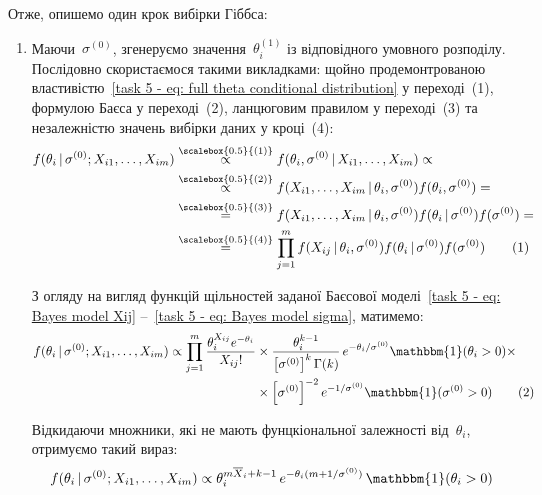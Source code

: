 Отже, опишемо один крок вибірки Гіббса:
\begin{enumerate}
    \item Маючи~$\sigma^{(0)}$, згенеруємо значення~$\theta_i^{(1)}$ із відповідного умовного розподілу. Послідовно скористаємося такими викладками: щойно продемонтрованою властивістю~\eqref{task 5 - eq: full theta conditional distribution} у переході~(1), формулою Баєса у переході~(2), ланцюговим правилом у переході~(3) та незалежністю значень вибірки даних у кроці~(4):
        \begin{align*}\label{task 5 - eq: chain of rules under full conditional distribution}
            f(\theta_i \,|\, \sigma^{(0)}; X_{i1},\ldots,X_{im})
            & \overset{\scalebox{0.5}{(1)}}{\propto} f(\theta_i, \sigma^{(0)} \,|\, X_{i1},\ldots,X_{im}) \propto \\
            & \overset{\scalebox{0.5}{(2)}}{\propto} f(X_{i1},\ldots,X_{im} \,|\, \theta_i, \sigma^{(0)}) f(\theta_i, \sigma^{(0)}) = \\
            & \overset{\scalebox{0.5}{(3)}}{=} f(X_{i1},\ldots,X_{im} \,|\, \theta_i, \sigma^{(0)}) f(\theta_i \,|\, \sigma^{(0)}) f(\sigma^{(0)}) = \\
            & \overset{\scalebox{0.5}{(4)}}{=} \prod_{j=1}^{m} f(X_{ij} \,|\, \theta_i, \sigma^{(0)}) f(\theta_i \,|\, \sigma^{(0)}) f(\sigma^{(0)}) \stepcounter{equation}\tag{\theequation}
        \end{align*}

        З огляду на вигляд функцій щільностей заданої Баєсової моделі~\eqref{task 5 - eq: Bayes model Xij} --~\eqref{task 5 - eq: Bayes model sigma}, матимемо:
        \begin{align*}
            f(\theta_i \,|\, \sigma^{(0)}; X_{i1},\ldots,X_{im}) \propto \prod_{j=1}^{m} \frac{\theta_i^{X_{ij}} e^{-\theta_i}}{X_{ij}!} 
            & \times \frac{\theta_i^{k-1}}{\left[\sigma^{(0)}\right]^{k}\Gamma(k)}\, e^{-\theta_i/\sigma^{(0)}} \mathbbm{1}(\theta_i>0) \times \\
            & \times \left[\sigma^{(0)}\right]^{-2}e^{-1/\sigma^{(0)}} \mathbbm{1}(\sigma^{(0)}>0) \stepcounter{equation}\tag{\theequation}
        \end{align*}

        Відкидаючи множники, які не мають фунцкіональної залежності від~$\theta_i$, отримуємо такий вираз:
        \begin{align}
            f(\theta_i \,|\, \sigma^{(0)}; X_{i1},\ldots,X_{im}) \propto \theta_i^{m\overline{X}_i + k - 1}\, e^{-\theta_i(m + 1/\sigma^{(0)})}\, \mathbbm{1}(\theta_i>0)
        \end{align}


\end{enumerate}
